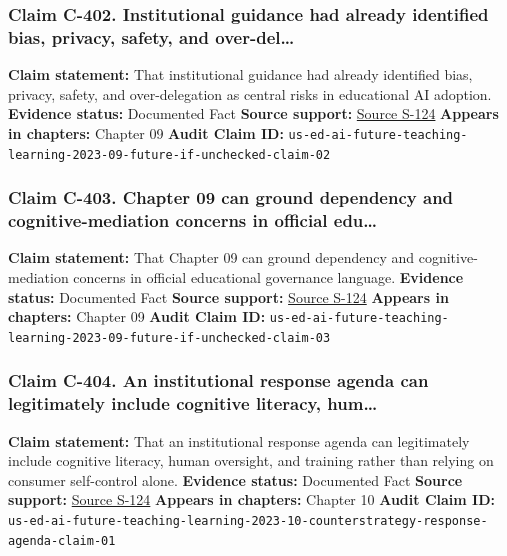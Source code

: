 \documentclass[
  american,
  11pt,
  letterpaper,
]{article}
\begin{document}
\subsubsection{Claim C-402. Institutional guidance had already
identified bias, privacy, safety, and
over-del\ldots{}}\label{claim-c-402-institutional-guidance-had-already-identified-bias-privacy-safety-and-over-del}

\textbf{Claim statement:} That institutional guidance had already
identified bias, privacy, safety, and over-delegation as central risks
in educational AI adoption. \textbf{Evidence status:} Documented Fact
\textbf{Source support:}
\hyperref[source-s-124-artificial-intelligence-and-the-future-of-teaching-and-learning-insights-and-recommendations]{Source
S-124} \textbf{Appears in chapters:} Chapter 09 \textbf{Audit Claim ID:}
\texttt{us-ed-ai-future-teaching-learning-2023-09-future-if-unchecked-claim-02}

\subsubsection{Claim C-403. Chapter 09 can ground dependency and
cognitive-mediation concerns in official
edu\ldots{}}\label{claim-c-403-chapter-09-can-ground-dependency-and-cognitive-mediation-concerns-in-official-edu}

\textbf{Claim statement:} That Chapter 09 can ground dependency and
cognitive-mediation concerns in official educational governance
language. \textbf{Evidence status:} Documented Fact \textbf{Source
support:}
\hyperref[source-s-124-artificial-intelligence-and-the-future-of-teaching-and-learning-insights-and-recommendations]{Source
S-124} \textbf{Appears in chapters:} Chapter 09 \textbf{Audit Claim ID:}
\texttt{us-ed-ai-future-teaching-learning-2023-09-future-if-unchecked-claim-03}

\subsubsection{Claim C-404. An institutional response agenda can
legitimately include cognitive literacy,
hum\ldots{}}\label{claim-c-404-an-institutional-response-agenda-can-legitimately-include-cognitive-literacy-hum}

\textbf{Claim statement:} That an institutional response agenda can
legitimately include cognitive literacy, human oversight, and training
rather than relying on consumer self-control alone. \textbf{Evidence
status:} Documented Fact \textbf{Source support:}
\hyperref[source-s-124-artificial-intelligence-and-the-future-of-teaching-and-learning-insights-and-recommendations]{Source
S-124} \textbf{Appears in chapters:} Chapter 10 \textbf{Audit Claim ID:}
\texttt{us-ed-ai-future-teaching-learning-2023-10-counterstrategy-response-agenda-claim-01}
\end{document}

